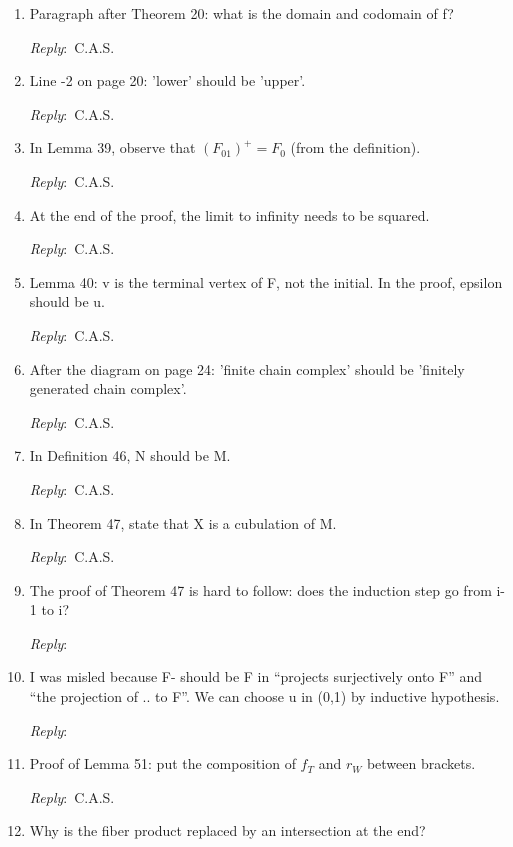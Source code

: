 \documentclass{amsart}
\newcommand{\ar}{\medskip\noindent\textit{Reply}:\ }
\newcommand{\tbw}{\ar \hrulefill}
\newcommand{\cas}{\ar C.A.S.}
\begin{document}
\begin{enumerate}
		\ar Thank you for this suggestion. We certainly agree. Unfortunately, said monograph has not been published yet, so its internal numbering will most certainly change.

		\item Paragraph after Theorem 20: what is the domain and codomain of f?

		\cas

		\item Line -2 on page 20: 'lower' should be 'upper'.

		\cas

		\item In Lemma 39, observe that $(F_{01})^+ = F_0$ (from the definition).

		\cas

		\item At the end of the proof, the limit to infinity needs to be squared.

		\cas

		\item Lemma 40: v is the terminal vertex of F, not the initial. In the proof, epsilon should be u.

		\cas

		\item After the diagram on page 24: 'finite chain complex' should be 'finitely generated chain complex'.

		\cas

		\item In Definition 46, N should be M.

		\cas

		\item In Theorem 47, state that X is a cubulation of M.

		\cas

		\item The proof of Theorem 47 is hard to follow: does the induction step go from i-1 to i?

		\tbw

		\item I was misled because F- should be F in “projects surjectively onto F” and “the projection of .. to F”. We can choose u in (0,1) by inductive hypothesis.

		\tbw

		\item Proof of Lemma 51: put the composition of $f_T$ and $r_W$ between brackets.

		\cas

		\item Why is the fiber product replaced by an intersection at the end?


\end{enumerate}
\end{document}
